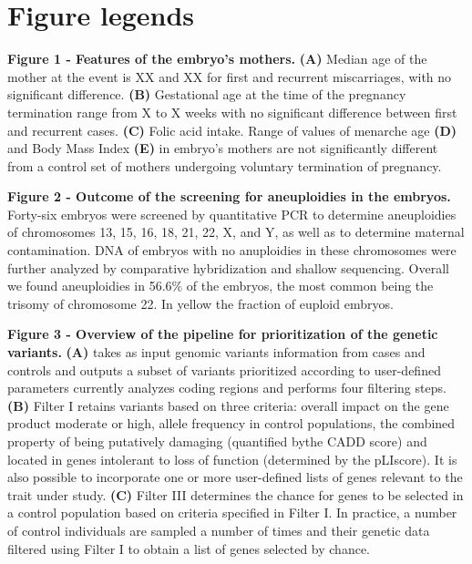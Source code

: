 \section*{Figure legends}


\textbf{Figure 1 - Features of the embryo's mothers.} \textbf{(A)} Median age of the mother at the event is XX and XX for first and recurrent miscarriages, with no significant difference. \textbf{(B)} Gestational age at the time of the pregnancy termination range from X to X weeks with no significant difference between first and recurrent cases.  \textbf{(C)} Folic acid intake. Range of values of menarche age \textbf{(D)} and Body Mass Index \textbf{(E)} in embryo's mothers are not significantly different from a control set of mothers undergoing voluntary termination of pregnancy.


\textbf{Figure 2 - Outcome of the screening for aneuploidies in the embryos.} Forty-six embryos were screened by quantitative PCR to determine aneuploidies of chromosomes 13, 15, 16, 18, 21, 22, X, and Y, as well as to determine maternal contamination. DNA of embryos with no anuploidies in these chromosomes were further analyzed by comparative hybridization and shallow sequencing. Overall we found aneuploidies in  56.6\% of the embryos, the most common being the trisomy of chromosome 22. In yellow the fraction of euploid embryos. 

\textbf{Figure 3 - Overview of the pipeline for prioritization of the genetic variants.} \textbf{(A)} \gp takes as input genomic variants information from cases and controls and outputs a subset of variants prioritized according to user-defined parameters \gp currently analyzes coding regions and performs four filtering steps. \textbf{(B)} Filter I retains variants based on three criteria: overall impact on the gene product moderate or high, allele frequency in control populations, the combined property of being putatively damaging (quantified bythe CADD score) and located in genes intolerant to loss of function (determined by the pLIscore). It is also possible to incorporate one or more user-defined lists of genes relevant to the trait under study. \textbf{(C)} Filter III determines the chance for genes to be selected in a control population based on criteria specified in Filter I. In practice, a number of control individuals are sampled a number of times and their genetic data filtered using Filter I to obtain a list of genes selected by chance.


